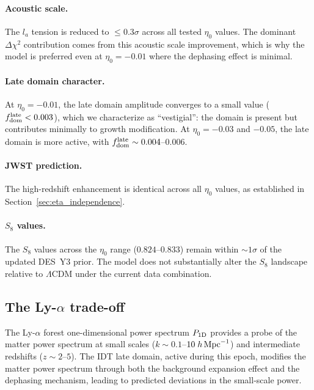 \documentclass[aps,prd,twocolumn,superscriptaddress,nofootinbib]{revtex4-2}
\newcommand{\fdom}{f_{\rm dom}}
\newcommand{\dchi}{\Delta\chi^2}
\begin{document}
\paragraph{Acoustic scale.} The $l_a$ tension is reduced to
$\leq 0.3\sigma$ across all tested $\eta_0$ values. The dominant
$\dchi$ contribution comes from this acoustic scale improvement,
which is why the model is preferred even at $\eta_0 = -0.01$ where
the dephasing effect is minimal.

\paragraph{Late domain character.} At $\eta_0 = -0.01$, the late
domain amplitude converges to a small value ($\fdom^{\rm late} <
0.003$), which we characterize as ``vestigial'': the domain is
present but contributes minimally to growth modification. At
$\eta_0 = -0.03$ and $-0.05$, the late domain is more active, with
$\fdom^{\rm late} \sim 0.004$--$0.006$.

\paragraph{JWST prediction.} The high-redshift enhancement is
identical across all $\eta_0$ values, as established in
Section~\ref{sec:eta_independence}.

\paragraph{$S_8$ values.} The $S_8$ values across the $\eta_0$
range ($0.824$--$0.833$) remain within $\sim 1\sigma$ of the
updated DES~Y3 prior. The model does not substantially alter the
$S_8$ landscape relative to $\Lambda$CDM under the current data
combination.

\subsection{The Ly-$\alpha$ trade-off}
\label{sec:lya}

The Ly-$\alpha$ forest one-dimensional power spectrum $P_{1{\rm D}}$
provides a probe of the matter power spectrum at small scales
($k \sim 0.1$--$10\;h\,{\rm Mpc}^{-1}$) and intermediate redshifts
($z \sim 2$--$5$). The IDT late domain, active during this epoch,
modifies the matter power spectrum through both the background
expansion effect and the dephasing mechanism, leading to predicted
deviations in the small-scale power.
\end{document}
